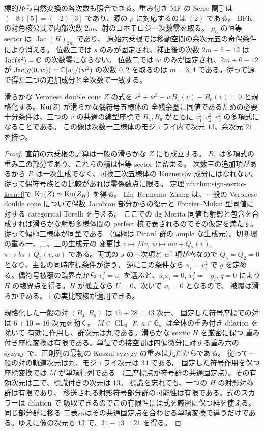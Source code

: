 標的から自然変換の各次数も照合できる。重み付き MF の Serre 関手は
$(-8)[5]=(-2)[3]$ であり、源の $\rho$ に対応するのは $(2)$ である。
BFK の対角核公式で内部次数 $2m$、射のコホモロジー次数零を取る。
$\mu_6$ の恒等 sector は $\operatorname{Jac}(H)_{2m}$ であり、
原始六乗根では移動空間の余次元五の奇偶条件により消える。
位数三では $s$ のみが固定され、補正後の次数 $2m+5-12$ は
$\operatorname{Jac}(s^2)=\mathbb C$ の次数零にならない。
位数二では $w$ のみが固定され、$2m+6-12$ が
$\operatorname{Jac}(g(0,w))=\mathbb C[w]/(w^2)$ の次数 $0,2$ を取るのは
$m=3,4$ である。従って源で得た二つの追加成分と全次数で一致する。

\begin{corollary}[次数一三様体側の像]\label{nft:cor:sign-target-locus}
滑らかな Veronese double cone $Z$ の式を
$s^2+w^3+wB_4(v)+B_6(v)=0$ と規格化する。$\operatorname{Ku}(Z)$ が滑らかな偶符号五様体の
全残余圏に同値であるための必要十分条件は、三つの $v$ の共通の線型座標で
$B_4,B_6$ がともに $v_1^2,v_2^2,v_3^2$ の多項式になることである。
この像は次数一三様体のモジュライ内で次元 $13$、余次元 $21$ を持つ。
\end{corollary}
\begin{proof}
直前の六乗根の計算は一般の滑らかな $Z$ にも成立する。
$R_1$ は多項式の重み二の部分であり、これらの積は恒等 sector に留まる。
次数三の追加項があるから $R$ は一次生成でなく、可換三次五様体の
Kuznetsov 成分にはなれない。従って偶符号族との比較があれば零係数点に限る。
定理\ref{nft:thm:sign-sextic-kernel}で $\operatorname{Ku}(Z)\simeq\operatorname{Ku}(Z_H)$ を得る。
Lin--Rennemo--Zhang \cite[Theorem~4.3, Proposition~4.11, Theorem~4.12]{SignLRZVeronese}
は、一般の Veronese double cone について偶数 Jacobian 部分からの復元と
Fourier--Mukai 型同値に対する categorical Torelli を与える。
ここでの dg Morita 同値も射影と包含を合成すれば滑らかな射影多様体間の
perfect 核で表されるのでその仮定を満たす。従って偏極三様体が同型である
（偏極は Picard 群の ample な生成元）。切断環の重み一、二、三の生成元の
変更は $v\mapsto Mv$, $w\mapsto aw+Q_2(v)$,
$s\mapsto bs+Q_3(v,w)$ である。両式の $s$ の一次項と $w^2$ 項が零なので
$Q_3=Q_2=0$ となり、主張の同時座標条件が従う。
逆にこの条件なら $u_i=v_i^2$ で $g$ を定める。偶符号被覆の臨界点から
$v_i^2=u_i$ を選ぶと、$u_ix_i=0$, $x_i^2=-g_i$, $q=0$ により
$H$ の臨界点を得る。$H$ が孤立なら $U=0$、次いで $x_i=0$ となるので、
被覆は滑らかである。上の実比較核が適用できる。

規格化した一般の対 $(B_4,B_6)$ は $15+28=43$ 次元、
固定した符号座標での対は $6+10=16$ 次元を動く。
$M\in\operatorname{GL}_3$ と $a\in\mathbb G_m$ は全体の重み付き dilation を除いて
有効に作用し、群次元は九である。滑らかな sextic $H$ を厳密に保つ
重み付き座標変換は有限である。単位での接空間は四偏微分に対する重み六の
syzygy で、正則列の最初の Koszul syzygy の重みは九だからである。
従って一般の対の軌道次元は九、モジュライ次元は $34$ である。
固定した符号作用を保つ座標変換では $M$ が単項行列である
（三座標点が符号群の共通固定点）。その有効次元は三で、標識付きの次元は $13$。
標識を忘れても、一つの $H$ の射影対称群は有限であり、
移送される射影符号部分群の可能性は有限である。式のスカラーは dilation で
吸収できるのでこの有限性には式を厳密に保つ群を使える。同じ部分群に移る
二表示はその共通固定点を合わせる単項変換で違うだけである。ゆえに像の次元も $13$
で、$34-13=21$ を得る。
\end{proof}

